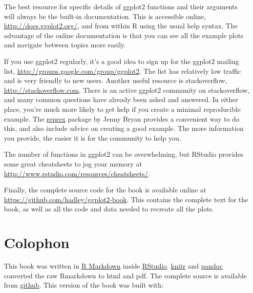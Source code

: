The best resource for specific details of ggplot2 functions and their
arguments will always be the built-in documentation. This is accessible
online, \url{http://docs.ggplot2.org/}, and from within R using the
usual help syntax. The advantage of the online documentation is that you
can see all the example plots and navigate between topics more easily.

If you use ggplot2 regularly, it's a good idea to sign up for the
ggplot2 mailing list, \url{http://groups.google.com/group/ggplot2}. The
list has relatively low traffic and is very friendly to new users.
Another useful resource is stackoverflow,
\url{http://stackoverflow.com}. There is an active ggplot2 community on
stackoverflow, and many common questions have already been asked and
answered. In either place, you're much more likely to get help if you
create a minimal reproducible example. The
\href{https://github.com/jennybc/reprex}{reprex} package by Jenny Bryan
provides a convenient way to do this, and also include advice on
creating a good example. The more information you provide, the easier it
is for the community to help you.

The number of functions in ggplot2 can be overwhelming, but RStudio
provides some great cheatsheets to jog your memory at
\url{http://www.rstudio.com/resources/cheatsheets/}.

Finally, the complete source code for the book is available online at
\url{https://github.com/hadley/ggplot2-book}. This contains the complete
text for the book, as well as all the code and data needed to recreate
all the plots.

\section{Colophon}

This book was written in \href{http://rmarkdown.rstudio.com/}{R
Markdown} inside \href{http://www.rstudio.com/ide/}{RStudio}.
\href{http://yihui.name/knitr/}{knitr} and
\href{http://johnmacfarlane.net/pandoc/}{pandoc} converted the raw
Rmarkdown to html and pdf. The complete source is available from
\href{https://github.com/hadley/ggplot2-book}{github}. This version of
the book was built with:

